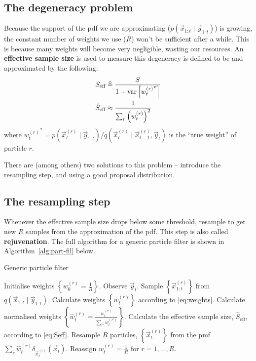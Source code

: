 \subsection{The degeneracy problem}
    Because the support of the pdf we are approximating ($p(\vec x_{1:t} \mid \vec y_{1:t})$) is growing, the constant number of weights we use ($R$) won't be sufficient after a while. This is because many weights will become very negligible, wasting our resources. An \textbf{effective sample size} is used to measure this degeneracy is defined to be and approximated by the following:
    \begin{align}
        S_\text{eff}        &\triangleq \frac{S}{1 + \operatorname{\mathrm{var}}\left[{w_t^{(r)}}^\ast\right]} \\
        \hat S_\text{eff}   &\approx \frac{1}{\sum_r \left(w_t^{(r)}\right)^2}\label{eq:Seff}
    \end{align}
    where ${w_t^{(r)}}^\ast = p(\vec x_t^{(r)} \mid \vec y_{1:t}) / q(\vec x_t^{(r)} \mid \vec x_{t-1}^{(r)}, \vec y_t)$ is the ``true weight'' of particle $r$.

    There are (among others) two solutions to this problem -- introduce the resampling step, and using a good proposal distribution.

\subsection{The resampling step}
    Whenever the effective sample size drops below some threshold, resample to get new $R$ samples from the approximation of the pdf. This step is also called \textbf{rejuvenation}. The full algorithm for a generic particle filter is shown in Algorithm~\ref{alg:part-fil} below.
    \begin{algorithm}
    \caption{Generic particle filter}\label{alg:part-fil}
        \begin{algorithmic}[1]
            \State Initialise weights $\left\{w_0^{(r)} = \frac{1}{R}\right\}$.
                \State Observe $\vec y_t$.
                \State Sample $\left\{\vec x_{1:t}^{(r)}\right\}$ from $q\left(\vec x_{1:t} \mid \vec y_{1:t}\right)$.
                \State Calculate weights $\left\{w_t^{(r)}\right\}$ according to \eqref{eq:weights}.
                \State Calculate normalised weights $\left\{\hat w_t^{(r)} = \frac{w_t^{(r)}}{\sum_{r'} w_t^{(r')}}\right\}$.
                \State Calculate the effective sample size, $\hat S_\text{eff}$, according to \eqref{eq:Seff}.
                    \State Resample $R$ particles, $\left\{\vec x_t^{(r)}\right\}$ from the pmf $\sum_r \hat w_t^{(r)} \delta_{\vec x_t^{(r)}}(\vec x_t)$.
                    \State Reassign $w_t^{(r)} = \frac{1}{R}$ for $r = 1, \dotsc, R$.
                \EndIf
            \EndFor
        \end{algorithmic}
    \end{algorithm}

